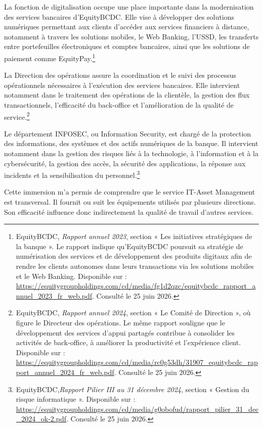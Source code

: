 \documentclass[12pt,a4paper]{report}
\begin{document}
La fonction de digitalisation occupe une place importante dans la modernisation des services bancaires d'EquityBCDC. Elle vise à développer des solutions numériques permettant aux clients d'accéder aux services financiers à distance, notamment à travers les solutions mobiles, le Web Banking, l'USSD, les transferts entre portefeuilles électroniques et comptes bancaires, ainsi que les solutions de paiement comme EquityPay.\footnote{EquityBCDC, \textit{Rapport annuel 2023}, section « Les initiatives stratégiques de la banque ». Le rapport indique qu'EquityBCDC poursuit sa stratégie de numérisation des services et de développement des produits digitaux afin de rendre les clients autonomes dans leurs transactions via les solutions mobiles et le Web Banking. Disponible sur : \url{https://equitygroupholdings.com/cd/media/fg1d2qzc/equitybcdc_rapport_annuel_2023_fr_web.pdf}. Consulté le 25 juin 2026.}


La Direction des opérations assure la coordination et le suivi des processus opérationnels nécessaires à l'exécution des services bancaires. Elle intervient notamment dans le traitement des opérations de la clientèle, la gestion des flux transactionnels, l'efficacité du back-office
et l'amélioration de la qualité de service.\footnote{EquityBCDC, \textit{Rapport annuel 2024},
section « Le Comité de Direction », où figure le Directeur des opérations. Le même rapport souligne que le développement des services d'appui partagés contribue à consolider les activités de back-office, à améliorer la productivité et l'expérience client. Disponible sur :
\url{https://equitygroupholdings.com/cd/media/rc0g53dh/31907_equitybcdc_rapport_annuel_2024_fr_web.pdf}. Consulté le 25 juin 2026.}

Le département INFOSEC, ou Information Security, est chargé de la protection
des informations, des systèmes et des actifs numériques de la banque. Il intervient notamment dans la gestion des risques liés à la technologie, à l'information et à la cybersécurité, la gestion des accès, la sécurité des applications, la réponse aux incidents et la sensibilisation du personnel.\footnote{EquityBCDC,\textit{Rapport Pilier III au 31 décembre 2024}, section « Gestion du risque informatique ».
Disponible sur : \url{https://equitygroupholdings.com/cd/media/g0obofud/rapport_pilier_31_dec_2024_ok-2.pdf}. Consulté le 25 juin 2026.}

Cette immersion m'a permis de comprendre que le service IT-Asset Management est transversal. Il fournit ou suit les équipements utilisés par plusieurs directions. Son efficacité influence donc indirectement la qualité de travail d'autres services.
\end{document}
